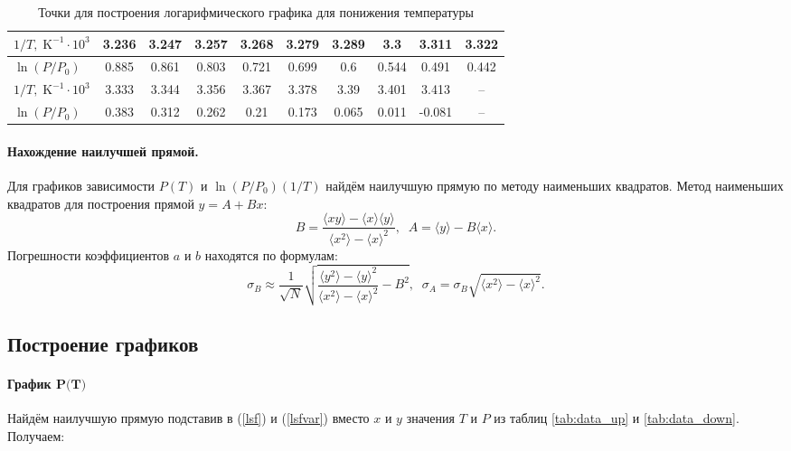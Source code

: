 \documentclass[a4paper,12pt]{article} %
\begin{document}
\begin{table}[h]
\begin{center}
\begin{tabular}{|l|c|c|c|c|c|c|c|c|c|}
\hline 
$1/T, \; \text{K}^{-1} \cdot 10^3$ & 3.236 & 3.247 & 3.257 & 3.268 & 3.279 & 3.289 & 3.3 & 3.311 & 3.322 \\ 
\hline 
$\ln(P/P_0)$ & 0.885 & 0.861 & 0.803 & 0.721 & 0.699 & 0.6 & 0.544 & 0.491 & 0.442 \\
\hline 
\hline
$1/T, \; \text{K}^{-1} \cdot 10^3$ & 3.333 & 3.344 & 3.356 & 3.367 & 3.378 & 3.39 & 3.401 & 3.413 & -- \\ 
\hline 
$\ln(P/P_0)$ & 0.383 & 0.312 & 0.262 & 0.21 & 0.173 & 0.065 & 0.011 & -0.081 & -- \\
\hline 
\end{tabular} 
\end{center}
\caption{Точки для построения логарифмического графика для понижения температуры}
\label{tab:graph_down}
\end{table}

\paragraph{Нахождение наилучшей прямой.}
Для графиков зависимости $ P(T) $ и $ \ln{(P/P_0)}(1/T )$ найдём наилучшую прямую по методу наименьших квадратов. Метод наименьших квадратов для построения прямой $ y = A + B x $:
\begin{equation}
B = \frac{\langle xy \rangle - \langle x \rangle \langle y \rangle}{\langle x^2 \rangle - \langle x \rangle ^ 2}, \;\;
A = \langle y \rangle - B \langle x \rangle . \label{lsf}
\end{equation}
Погрешности коэффициентов $a$ и $b$ находятся по формулам:
\begin{equation}
\sigma_B \approx \frac{1}{\sqrt{N}}\sqrt{\frac{\langle y^2 \rangle - \langle y \rangle ^ 2}{\langle x^2 \rangle - \langle x \rangle ^ 2} - B^2}, \;\;
\sigma_A = \sigma_B \sqrt{\langle x^2 \rangle - \langle x \rangle ^ 2}. \label{lsfvar}
\end{equation}

\subsection{Построение графиков}

\paragraph{График $\textbf{P(T)}$}
Найдём наилучшую прямую подставив в (\ref{lsf}) и (\ref{lsfvar}) вместо $x$ и $y$ значения $T$ и $P$ из таблиц \ref{tab:data_up} и \ref{tab:data_down}. Получаем:
\end{document}
